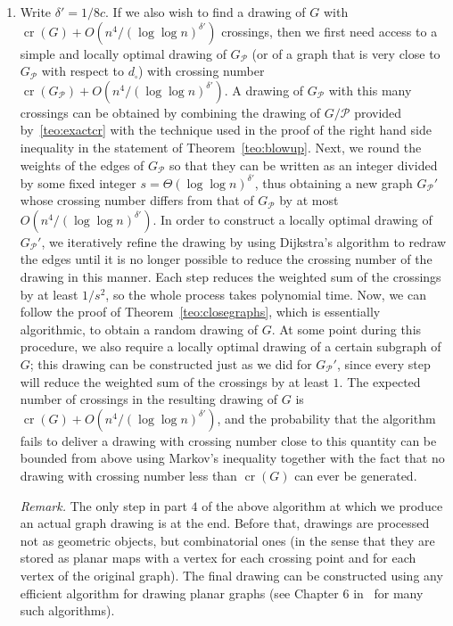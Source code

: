 \documentclass{article}
\begin{document}
\begin{enumerate}
    \item Write $\delta'=1/8c$. If we also wish to find a drawing of $G$ with $\mathop{\mathrm{cr}}(G)+O(n^4/(\log\log n)^{\delta'})$ crossings, then we first need access to a simple and locally optimal drawing of $G_\mathcal{P}$ (or of a graph that is very close to $G_\mathcal{P}$ with respect to $d_\square$) with crossing number $\mathop{\mathrm{cr}}(G_\mathcal{P})+O(n^4/(\log\log n)^{\delta'})$. A drawing of $G_\mathcal{P}$ with this many crossings can be obtained by combining the drawing of $G/\mathcal{P}$ provided by~\ref{teo:exactcr} with the technique used in the proof of the right hand side inequality in the statement of Theorem~\ref{teo:blowup}. Next, we round the weights of the edges of $G_{\mathcal P}$ so that they can be written as an integer divided by some fixed integer $s=\Theta(\log\log n)^{\delta'}$, thus obtaining a new graph $G_\mathcal{P}'$ whose crossing number differs from that of $G_\mathcal{P}$ by at most $O(n^4/(\log\log n)^{\delta'})$. In order to construct a locally optimal drawing of $G_\mathcal{P}'$, we iteratively refine the drawing by using Dijkstra's algorithm to redraw the edges until it is no longer possible to reduce the crossing number of the drawing in this manner. Each step reduces the weighted sum of the crossings by at least $1/s^2$, so the whole process takes polynomial time. Now, we can follow the proof of Theorem~\ref{teo:closegraphs}, which is essentially algorithmic, to obtain a random drawing of $G$. At some point during this procedure, we also require a locally optimal drawing of a certain subgraph of $G$; this drawing can be constructed just as we did for $G_\mathcal{P}'$, since every step will reduce the weighted sum of the crossings by at least $1$. The expected number of crossings in the resulting drawing of $G$ is $\mathop{\mathrm{cr}}(G)+O(n^4/(\log\log n)^{\delta'})$, and the probability that the algorithm fails to deliver a drawing with crossing number close to this quantity can be bounded from above using Markov's inequality together with the fact that no drawing with crossing number less than $\mathop{\mathrm{cr}}(G)$ can ever be generated.

    \textit{Remark.} The only step in part $4$ of the above algorithm at which we produce an actual graph drawing is at the end. Before that, drawings are processed not as geometric objects, but combinatorial ones (in the sense that they are stored as planar maps with a vertex for each crossing point and for each vertex of the original graph). The final drawing can be constructed using any efficient algorithm for drawing planar graphs (see Chapter 6 in~\cite{tamassia_handbook} for many such algorithms).
\end{enumerate}
\end{document}
